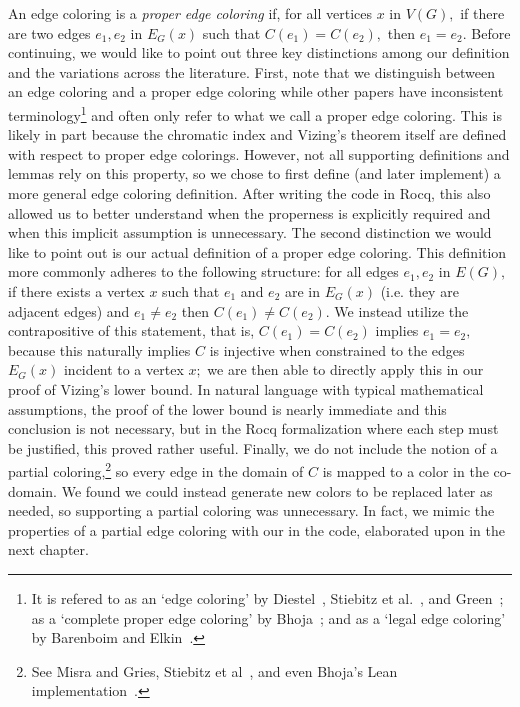 An edge coloring is a \textit{proper edge coloring} if, for all vertices $x$ in $V(G),$ if there are two edges $e_1, e_2$ in $E_G(x)$ such that $C(e_1) = C(e_2),$ then $e_1 = e_2.$ Before continuing, we would like to point out three key distinctions among our definition and the variations across the literature. First, note that we distinguish between an edge coloring and a proper edge coloring while other papers have inconsistent terminology\footnote{It is refered to as an `edge coloring' by Diestel~\cite{Diestel}, Stiebitz et al.~\cite{GECBook}, and Green~\cite{Green}; as a `complete proper edge coloring' by Bhoja~\cite{Bhoja}; and as a `legal edge coloring' by Barenboim and Elkin~\cite{ElkinDistributed}.} and often only refer to what we call a proper edge coloring. This is likely in part because the chromatic index and Vizing's theorem itself are defined with respect to proper edge colorings. However, not all supporting definitions and lemmas rely on this property, so we chose to first define (and later implement) a more general edge coloring definition. After writing the code in Rocq, this also allowed us to better understand when the properness is explicitly required and when this implicit assumption is unnecessary. The second distinction we would like to point out is our actual definition of a proper edge coloring. This definition more commonly adheres to the following structure: for all edges $e_1, e_2$ in $E(G),$ if there exists a vertex $x$ such that $e_1$ and $e_2$ are in $E_G(x)$ (i.e. they are adjacent edges) and $e_1 \neq e_2$ then $C(e_1) \neq C(e_2).$ We instead utilize the contrapositive of this statement, that is, $C(e_1) = C(e_2)$ implies $e_1 = e_2,$ because this naturally implies $C$ is injective when constrained to the edges $E_G(x)$ incident to a vertex $x;$ we are then able to directly apply this in our proof of Vizing's lower bound. In natural language with typical mathematical assumptions, the proof of the lower bound is nearly immediate and this conclusion is not necessary, but in the Rocq formalization where each step must be justified, this proved rather useful. Finally, we do not include the notion of a partial coloring,\footnote{See Misra and Gries\cite{Misra}, Stiebitz et al~\cite{GECBook}, and even Bhoja's Lean implementation~\cite{Bhoja}.} so every edge in the domain of $C$ is mapped to a color in the co-domain. We found we could instead generate new colors to be replaced later as needed, so supporting a partial coloring was unnecessary. In fact, we mimic the properties of a partial edge coloring with our  in the code, elaborated upon in the next chapter.

